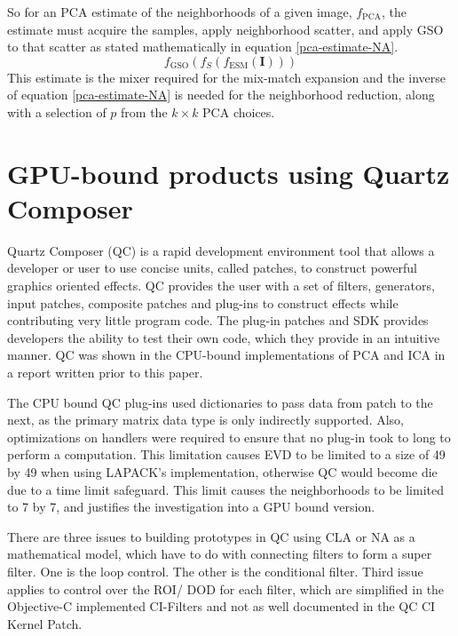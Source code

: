 \documentclass[11pt]{article}
\begin{document}
So for an PCA estimate of the neighborhoods of a given image, $f_{\textrm{PCA}}$, the estimate must acquire the samples, apply neighborhood scatter, and apply GSO to that scatter as stated mathematically in equation \ref{pca-estimate-NA}.
\begin{equation}
f_{\textrm{GSO}} (f_S (f_{\textrm{ESM}}(\mathbf{I}) )) \label{pca-estimate-NA}
\end{equation}
This estimate is the mixer required for the mix-match expansion and the inverse of equation \ref{pca-estimate-NA} is needed for the neighborhood reduction, along with a selection of $p$ from the $k \times k$ PCA choices.  

\section{GPU-bound products using Quartz Composer}
Quartz Composer (QC) is a rapid development environment tool that allows a developer or user to use concise units, called patches, to construct powerful graphics oriented effects.  QC provides the user with a set of filters, generators, input patches, composite patches and plug-ins to construct effects while contributing very little program code.  The plug-in patches and SDK provides developers the ability to test their own code, which they provide in an intuitive manner.  QC was shown in the CPU-bound implementations of PCA and ICA in a report written prior to this paper\cite{beatty-report-mitra}.    

The CPU bound QC plug-ins used dictionaries to pass data from patch to the next, as the primary matrix data type is only indirectly supported.  Also, optimizations on handlers were required to ensure that no plug-in took to long to perform a computation.  This limitation causes EVD to be limited to a size of 49 by 49 when using LAPACK's implementation,  otherwise QC would become die due to a time limit safeguard.   This limit causes the neighborhoods to be limited to 7 by 7, and justifies the investigation into a GPU bound version.  

There are three issues to building prototypes in QC using CLA or NA as a mathematical model, which have to do with connecting filters to form a super filter.  One is the loop control.  The other is the conditional filter.   Third issue applies to control over the ROI/ DOD for each filter, which are simplified in the Objective-C implemented CI-Filters and not as well documented in the QC CI Kernel Patch. 
\end{document}
